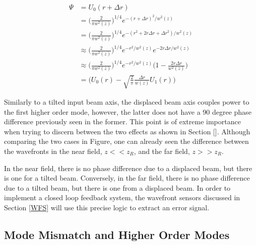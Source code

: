 \documentclass[oneside]{book}
\begin{document}
		\begin{equation}
		\begin{aligned}
			\Psi 	&=  		U_{0}(r + \Delta r	) 
			\\		&= 			\bigg( \frac{2}{\pi w^2(z)} \bigg)^{1/4}  e^{-(r+\Delta r)^2/w^2(z)}
			\\		&= 			\bigg( \frac{2}{\pi w^2(z)} \bigg)^{1/4}  e^{-(r^2 + 2r \Delta r  + \Delta r^2)/w^2(z)}
			\\		&\approx 	\bigg( \frac{2}{\pi w^2(z)} \bigg)^{1/4}  e^{-r^2/w^2(z)} e^{-2r \Delta r/w^2(z)}
			\\		&\approx 	\bigg( \frac{2}{\pi w^2(z)} \bigg)^{1/4}  e^{-r^2/w^2(z)} \bigg(1 - \frac{2r \Delta r}{w^2(z)} \bigg)
			\\		&=			\bigg( U_0(r) - \sqrt{\frac{2}{\pi}} \frac{\Delta r }{w(z)} U_1(r)	 \bigg)
		\end{aligned}
		\end{equation} 
		
		Similarly to a tilted input beam axis, the displaced beam axis couples power to the first higher order mode, however, the latter does not have a 90 degree phase difference previously seen in the former.  This point is of extreme importance when trying to discern between the two effects as shown in Section [].  Although comparing the two cases in Figure, one can already seen the difference between the wavefronts in the near field, $z<<z_R$, and the far field, $z>>z_R$.  
		
		In the near field, there is no phase difference due to a displaced beam, but there is one for a tilted beam.  Conversely, in the far field, there is no phase difference due to a tilted beam, but there is one from a displaced beam.  In order to implement a closed loop feedback system, the wavefront sensors discussed in Section \ref{WFS} will use this precise logic to extract an error signal.
		
		
		\subsection{Mode Mismatch and Higher Order Modes}\label{Modemismatch}
		
		
\end{document}
